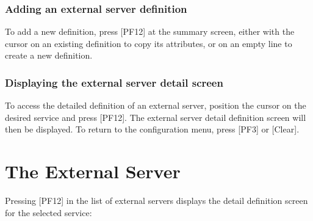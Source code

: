 \documentclass[letterpaper,10pt,english]{sphinxmanual}
\begin{document}
\subsection{Adding an external server definition}
\label{\detokenize{connectivity_guide:adding-an-external-server-definition}}
To add a new definition, press {[}PF12{]} at the summary screen, either with the cursor on an existing definition to copy its attributes, or on an empty line to create a new definition.


\subsection{Displaying the external server detail screen}
\label{\detokenize{connectivity_guide:displaying-the-external-server-detail-screen}}
To access the detailed definition of an external server, position the cursor on the desired service and press {[}PF12{]}. The external server detail definition screen will then be displayed. To return to the configuration menu, press {[}PF3{]} or {[}Clear{]}.


\chapter{The External Server}
\label{\detokenize{connectivity_guide:the-external-server}}
Pressing {[}PF12{]} in the list of external servers displays the detail definition screen for the selected service:


\end{document}
